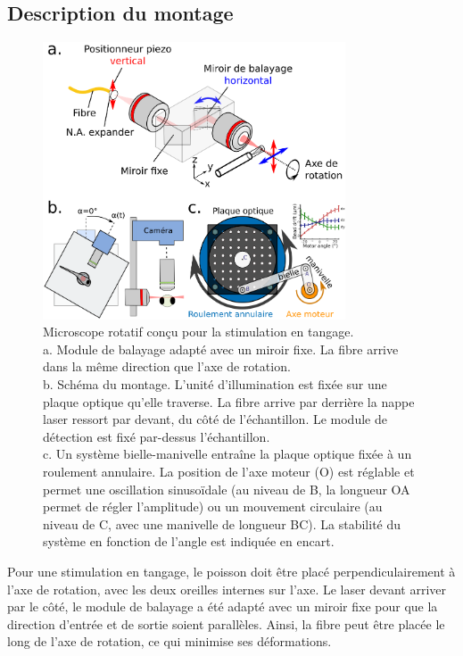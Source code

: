 \subsection{Description du montage}

\begin{figure}
\centering
\includegraphics[width=0.8\textwidth]{./files/miniature_light-sheet_tilt.svg.png}
\caption{Microscope rotatif conçu pour la stimulation en tangage.
\\a. Module de balayage adapté avec un miroir fixe. La fibre arrive dans la même direction que l'axe de rotation.
\\b. Schéma du montage. L'unité d'illumination est fixée sur une plaque optique qu'elle traverse. La fibre arrive par derrière la nappe laser ressort par devant, du côté de l'échantillon. Le module de détection est fixé par-dessus l'échantillon.
\\c. Un système bielle-manivelle entraîne la plaque optique fixée à un roulement annulaire. La position de l'axe moteur (O) est réglable et permet une oscillation sinusoïdale (au niveau de B, la longueur OA permet de régler l'amplitude) ou un mouvement circulaire (au niveau de C, avec une manivelle de longueur BC). La stabilité du système en fonction de l'angle est indiquée en encart.
\label{FIGtiltlightsheet}}
\end{figure}

Pour une stimulation en tangage, le poisson doit être placé perpendiculairement à l'axe de rotation, avec les deux oreilles internes sur l'axe. Le laser devant arriver par le côté, le module de balayage a été adapté avec un miroir fixe pour que la direction d'entrée et de sortie soient parallèles. Ainsi, la fibre peut être placée le long de l'axe de rotation, ce qui minimise ses déformations.

